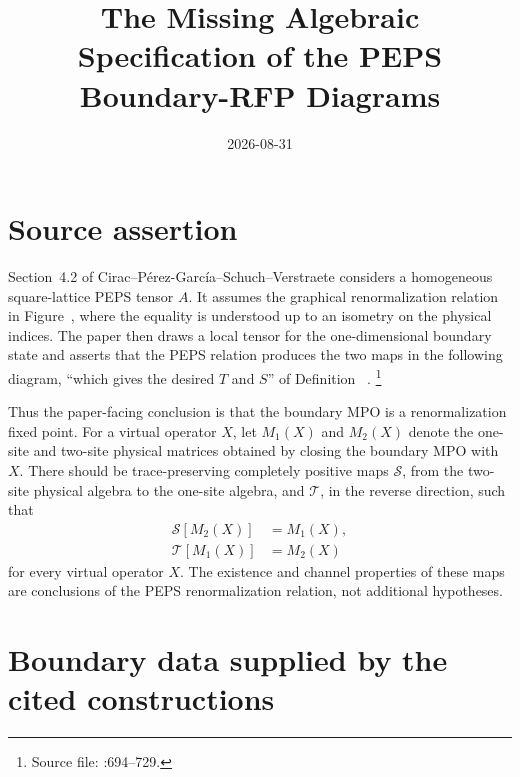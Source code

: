 \documentclass{article}
\title{The Missing Algebraic Specification of the PEPS Boundary-RFP Diagrams}
\author{}
\date{2026-08-31}
\begin{document}
\maketitle
{}

\section{Source assertion}

Section~4.2 of Cirac--P\'erez-Garc\'ia--Schuch--Verstraete considers a
homogeneous square-lattice PEPS tensor $A$. It assumes the graphical
renormalization relation in Figure~, where the equality is
understood up to an isometry on the physical indices. The paper then draws a
local tensor for the one-dimensional boundary state and asserts that the PEPS
relation produces the two maps in the following diagram, ``which gives the
desired $T$ and $S$'' of Definition~
\cite[lines~694--729]{Cirac2016MPDO_arXiv}.
\footnote{Source file:
    :694--729.}

Thus the paper-facing conclusion is that the boundary MPO is a
renormalization fixed point. For a virtual operator $X$, let $M_1(X)$ and
$M_2(X)$ denote the one-site and two-site physical matrices obtained by closing
the boundary MPO with $X$. There should be trace-preserving completely positive
maps $\mathcal S$, from the two-site physical algebra to the one-site algebra,
and $\mathcal T$, in the reverse direction, such that
\begin{align}
    \mathcal S[M_2(X)] & = M_1(X),
    \label{eq:cpsv16_peps_boundary_rfp_specification_coarse_graining} \\
    \mathcal T[M_1(X)] & = M_2(X)
    \label{eq:cpsv16_peps_boundary_rfp_specification_refinement}
\end{align}
for every virtual operator $X$. The existence and channel properties of these
maps are conclusions of the PEPS renormalization relation, not additional
hypotheses.

\section{Boundary data supplied by the cited constructions}
\end{document}
